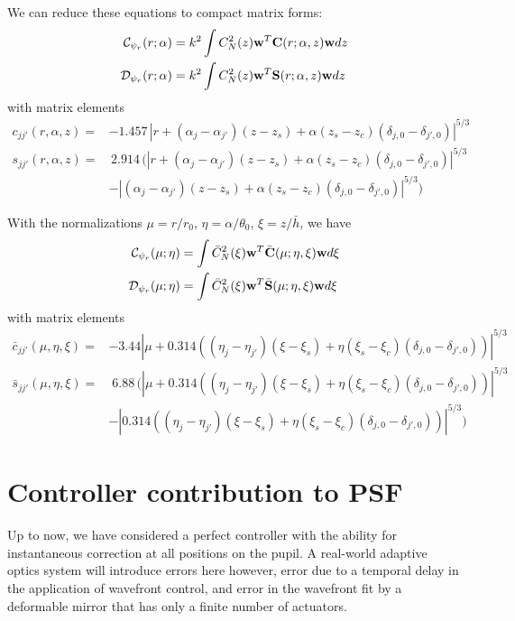 \documentclass[11pt, oneside]{article}   	%
\begin{document}
We can reduce these equations to compact matrix forms:
\begin{align}
{\cal C}_{\psi_r}(r;\alpha) &= k^2\int C_N^2(z) {\bf w}^T {\bf C}(r;\alpha,z) {\bf w} dz \nonumber \\
{\cal D}_{\psi_r}(r;\alpha) &= k^2\int C_N^2(z) {\bf w}^T {\bf S}(r; \alpha,z) {\bf w} dz 
\end{align}
with matrix elements
\begin{align}
c_{jj'}(r,\alpha,z) = &-1.457\,\left | r+(\alpha_j-\alpha_{j'})(z-z_s) + \alpha(z_s-z_c)(\delta_{j,0}-\delta_{j',0}) \right |^{5/3} \nonumber \\
s_{jj'}(r,\alpha,z) = &\,2.914\,\Big(\left | r+(\alpha_j-\alpha_{j'})(z-z_s) + \alpha(z_s-z_c)(\delta_{j,0}-\delta_{j',0}) \right |^{5/3} \nonumber \\
              &- \left | (\alpha_j-\alpha_{j'})(z-z_s) + \alpha(z_s-z_c)(\delta_{j,0}-\delta_{j',0}) \right |^{5/3}\Big)
\end{align}

With the normalizations $\mu = r/r_0$, $\eta = \alpha/\theta_0$, $\xi = z/{\bar h}$, we have
\begin{align}
{\cal C}_{\psi_r}(\mu;\eta) &= \int {\bar C}_N^2(\xi) {\bf w}^T {\bar {\bf C}}(\mu;\eta,\xi) {\bf w} d\xi \nonumber \\
{\cal D}_{\psi_r}(\mu;\eta) &= \int {\bar C}_N^2(\xi) {\bf w}^T {\bar {\bf S}}(\mu;\eta,\xi) {\bf w} d\xi 
\end{align}
with matrix elements
\begin{align}
{\bar c}_{jj'}(\mu,\eta,\xi) = &-3.44 \left | \mu+0.314((\eta_j-\eta_{j'})(\xi-\xi_s) + \eta(\xi_s-\xi_c)(\delta_{j,0}-\delta_{j',0})) \right |^{5/3} \nonumber \\
{\bar s}_{jj'}(\mu,\eta,\xi) = &\;6.88 \,\Big( \left | \mu+0.314((\eta_j-\eta_{j'})(\xi-\xi_s) + \eta(\xi_s-\xi_c)(\delta_{j,0}-\delta_{j',0})) \right |^{5/3} \nonumber \\
               &-\left | 0.314( (\eta_j-\eta_{j'})(\xi-\xi_s) + \eta(\xi_s-\xi_c)(\delta_{j,0}-\delta_{j',0})) \right |^{5/3} \Big)
\end{align}

\section{Controller contribution to PSF}

Up to now, we have considered a perfect controller with the ability for instantaneous correction at all positions on the pupil. A real-world adaptive optics system will introduce errors here however, error due to a temporal delay in the application of wavefront control, and error in the wavefront fit by a deformable mirror that has only a finite number of actuators.
\end{document}
